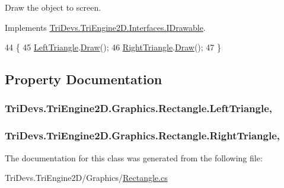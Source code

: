 Draw the object to screen. 



Implements \hyperlink{interface_tri_devs_1_1_tri_engine2_d_1_1_interfaces_1_1_i_drawable_a97752e755d82e7dcd22dc173192790a5}{Tri\-Devs.\-Tri\-Engine2\-D.\-Interfaces.\-I\-Drawable}.


\begin{DoxyCode}
44         \{
45             \hyperlink{class_tri_devs_1_1_tri_engine2_d_1_1_graphics_1_1_rectangle_aa100178178cdaebc6eafeec2c19aafe9}{LeftTriangle}.\hyperlink{class_tri_devs_1_1_tri_engine2_d_1_1_graphics_1_1_triangle_aaaeb6be0f2ec3e13a4381c953e565db8}{Draw}();
46             \hyperlink{class_tri_devs_1_1_tri_engine2_d_1_1_graphics_1_1_rectangle_a89366e6a5a27c27770e75d9c2e5f095d}{RightTriangle}.\hyperlink{class_tri_devs_1_1_tri_engine2_d_1_1_graphics_1_1_triangle_aaaeb6be0f2ec3e13a4381c953e565db8}{Draw}();
47         \}
\end{DoxyCode}


\subsection{Property Documentation}
\hypertarget{class_tri_devs_1_1_tri_engine2_d_1_1_graphics_1_1_rectangle_aa100178178cdaebc6eafeec2c19aafe9}{
\subsubsection[{Left\-Triangle}]{ Tri\-Devs.\-Tri\-Engine2\-D.\-Graphics.\-Rectangle.\-Left\-Triangle\hspace{0.3cm}{\ttfamily [get]}, {\ttfamily [set]}}}\label{class_tri_devs_1_1_tri_engine2_d_1_1_graphics_1_1_rectangle_aa100178178cdaebc6eafeec2c19aafe9}
\hypertarget{class_tri_devs_1_1_tri_engine2_d_1_1_graphics_1_1_rectangle_a89366e6a5a27c27770e75d9c2e5f095d}{
\subsubsection[{Right\-Triangle}]{ Tri\-Devs.\-Tri\-Engine2\-D.\-Graphics.\-Rectangle.\-Right\-Triangle\hspace{0.3cm}{\ttfamily [get]}, {\ttfamily [set]}}}\label{class_tri_devs_1_1_tri_engine2_d_1_1_graphics_1_1_rectangle_a89366e6a5a27c27770e75d9c2e5f095d}


The documentation for this class was generated from the following file\-:\begin{DoxyCompactItemize}
\item 
Tri\-Devs.\-Tri\-Engine2\-D/\-Graphics/\hyperlink{_graphics_2_rectangle_8cs}{Rectangle.\-cs}\end{DoxyCompactItemize}
